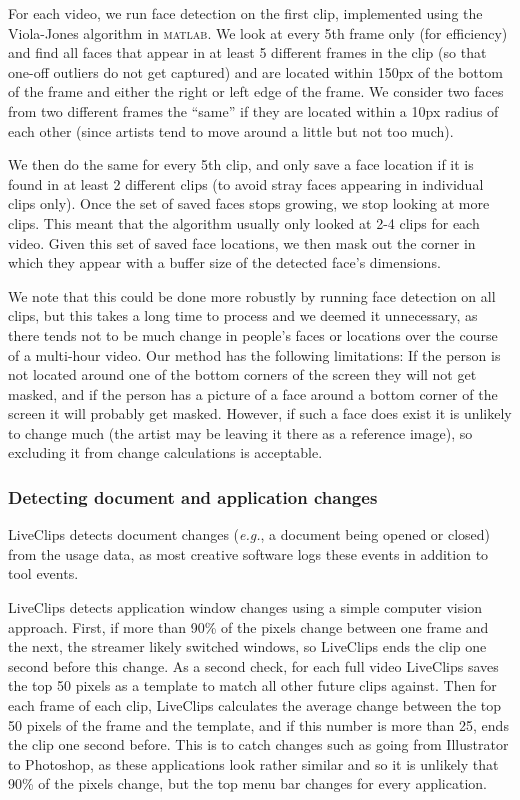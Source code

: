 For each video, we run face detection on the first clip, implemented using the Viola-Jones algorithm in \textsc{matlab}. We look at every 5th frame only (for efficiency) and find all faces that appear in at least 5 different frames in the clip (so that one-off outliers do not get captured) and are located within 150px of the bottom of the frame and either the right or left edge of the frame. We consider two faces from two different frames the ``same'' if they are located within a 10px radius of each other (since artists tend to move around a little but not too much). 

We then do the same for every 5th clip, and only save a face location if it is found in at least 2 different clips (to avoid stray faces appearing in individual clips only). Once the set of saved faces stops growing, we stop looking at more clips. This meant that the algorithm usually only looked at 2-4 clips for each video. Given this set of saved face locations, we then mask out the corner in which they appear with a buffer size of the detected face's dimensions.

We note that this could be done more robustly by running face detection on all clips, but this takes a long time to process and we deemed it unnecessary, as there tends not to be much change in people's faces or locations over the course of a multi-hour video. Our method has the following limitations: If the person is not located around one of the bottom corners of the screen they will not get masked, and if the person has a picture of a face around a bottom corner of the screen it will probably get masked. However, if such a face does exist it is unlikely to change much (the artist may be leaving it there as a reference image), so excluding it from change calculations is acceptable.

\subsubsection{Detecting document and application changes}
LiveClips detects document changes (\textit{e.g.}, a document being opened or closed) from the usage data, as most creative software logs these events in addition to tool events. 

LiveClips detects application window changes using a simple computer vision approach. First, if more than 90\% of the pixels change between one frame and the next, the streamer likely switched windows, so LiveClips ends the clip one second before this change. As a second check, for each full video LiveClips saves the top 50 pixels as a template to match all other future clips against. Then for each frame of each clip, LiveClips calculates the average change between the top 50 pixels of the frame and the template, and if this number is more than 25, ends the clip one second before. This is to catch changes such as going from Illustrator to Photoshop, as these applications look rather similar and so it is unlikely that 90\% of the pixels change, but the top menu bar changes for every application.

